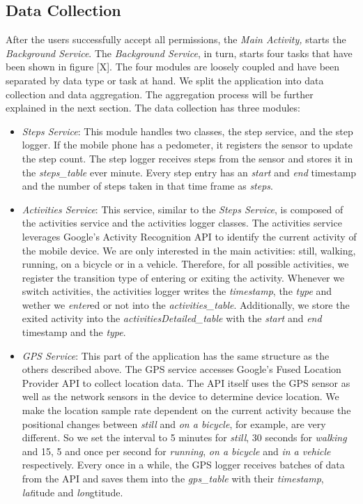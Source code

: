 \subsection{Data Collection}
After the users successfully accept all permissions, the \textit{Main Activity,} starts the \textit{Background Service}. The \textit{Background Service}, in turn, starts four tasks that have been shown in figure [X]. The four modules are loosely coupled and have been separated by data type or task at hand. We split the application into data collection and data aggregation. The aggregation process will be further explained in the next section. The data collection has three modules:
\begin{itemize}
    \item \textit{Steps Service}: This module handles two classes, the step service, and the step logger. If the mobile phone has a pedometer, it registers the sensor to update the step count. The step logger receives steps from the sensor and stores it in the \textit{steps\_table} ever minute. Every step entry has an \textit{start} and \textit{end} timestamp and the number of steps taken in that time frame as \textit{steps}.
    \item \textit{Activities Service}: This service, similar to the \textit{Steps Service}, is composed of the activities service and the activities logger classes. The activities service leverages Google's Activity Recognition API to identify the current activity of the mobile device. We are only interested in the main activities: still, walking, running, on a bicycle or in a vehicle. Therefore, for all possible activities, we register the transition type of entering or exiting the activity. Whenever we switch activities, the activities logger writes the \textit{timestamp}, the \textit{type} and wether we \textit{enter}ed or not into the \textit{activities\_table}. Additionally, we store the exited activity into the \textit{activitiesDetailed\_table} with the \textit{start} and \textit{end} timestamp and the \textit{type}.
     \item \textit{GPS Service}: This part of the application has the same structure as the others described above. The GPS service accesses Google's Fused Location Provider API to collect location data. The API itself uses the GPS sensor as well as the network sensors in the device to determine device location. We make the location sample rate dependent on the current activity because the positional changes between \textit{still} and \textit{on a bicycle}, for example, are very different. So we set the interval to 5 minutes for \textit{still}, 30 seconds for \textit{walking} and 15, 5 and once per second for \textit{running}, \textit{on a bicycle} and \textit{in a vehicle} respectively. Every once in a while, the GPS logger receives batches of data from the API and saves them into the \textit{gps\_table} with their  \textit{timestamp}, \textit{lat}itude and \textit{lon}gtitude.
\end{itemize}

